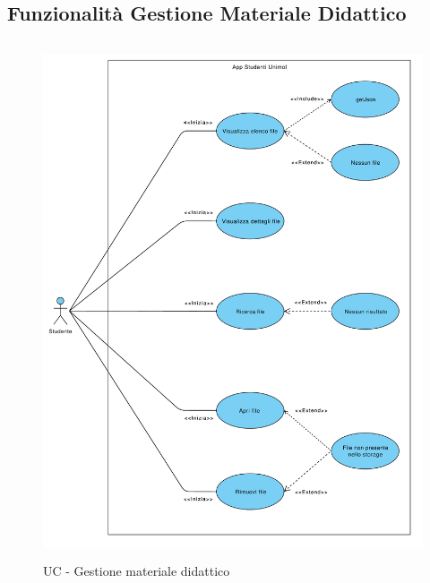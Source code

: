 \subsection{Funzionalità Gestione Materiale Didattico}
\begin{figure}[h]
	\includegraphics[width=6.5in, height=6in]{imgs/gruppo1/use_case_diagrams/UCD3-materiale_didattico.pdf}
	\caption{UC - Gestione materiale didattico}
	\label{diag:gestioneMatDidattico}
\end{figure}
\clearpage

